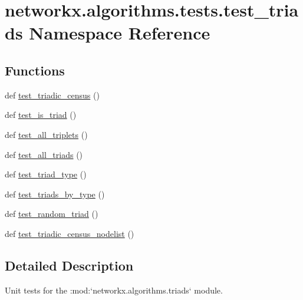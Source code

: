 \hypertarget{namespacenetworkx_1_1algorithms_1_1tests_1_1test__triads}{}\section{networkx.\+algorithms.\+tests.\+test\+\_\+triads Namespace Reference}
\label{namespacenetworkx_1_1algorithms_1_1tests_1_1test__triads}
\subsection*{Functions}
\begin{DoxyCompactItemize}
\item 
def \hyperlink{namespacenetworkx_1_1algorithms_1_1tests_1_1test__triads_ac94a0bc32a0393473b95d5ccde226fbf}{test\+\_\+triadic\+\_\+census} ()
\item 
def \hyperlink{namespacenetworkx_1_1algorithms_1_1tests_1_1test__triads_aacd051f1af0020be60553ee32c81e394}{test\+\_\+is\+\_\+triad} ()
\item 
def \hyperlink{namespacenetworkx_1_1algorithms_1_1tests_1_1test__triads_af1e55323079df240ca86b79b2d1ee3a0}{test\+\_\+all\+\_\+triplets} ()
\item 
def \hyperlink{namespacenetworkx_1_1algorithms_1_1tests_1_1test__triads_aea6b32d29b1ef6a843abc2f44b70058d}{test\+\_\+all\+\_\+triads} ()
\item 
def \hyperlink{namespacenetworkx_1_1algorithms_1_1tests_1_1test__triads_a08a1f0b55882eceab6c1e079e985d3d8}{test\+\_\+triad\+\_\+type} ()
\item 
def \hyperlink{namespacenetworkx_1_1algorithms_1_1tests_1_1test__triads_aea490d36765af699e8293e056a88ea12}{test\+\_\+triads\+\_\+by\+\_\+type} ()
\item 
def \hyperlink{namespacenetworkx_1_1algorithms_1_1tests_1_1test__triads_a5c332aaa7fcfc444a5b60fcc85966649}{test\+\_\+random\+\_\+triad} ()
\item 
def \hyperlink{namespacenetworkx_1_1algorithms_1_1tests_1_1test__triads_a4c6b5b9d09b9042a016f1528bba6fb60}{test\+\_\+triadic\+\_\+census\+\_\+nodelist} ()
\end{DoxyCompactItemize}


\subsection{Detailed Description}
\begin{DoxyVerb}Unit tests for the :mod:`networkx.algorithms.triads` module.\end{DoxyVerb}
 


